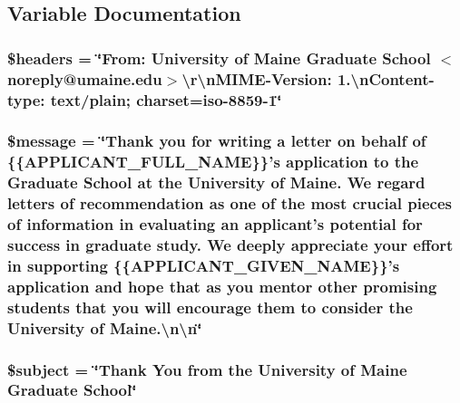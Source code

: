 \subsection{Variable Documentation}
\hypertarget{reference_thank_you_8email_8php_a52500036ee807241b8b4b7e2367c49ef}{
\subsubsection[{\$headers}]{\setlength{\rightskip}{0pt plus 5cm}\$headers = \char`\"{}From\-: University of Maine Graduate School $<$noreply@umaine.\-edu$>$\textbackslash{}r\textbackslash{}n\-M\-I\-M\-E-\/Version\-: 1.\textbackslash{}n\-Content-\/type\-: text/plain; charset=iso-\/8859-\/1\char`\"{}}}\label{reference_thank_you_8email_8php_a52500036ee807241b8b4b7e2367c49ef}
\hypertarget{reference_thank_you_8email_8php_abf17cb2dba2ed17cb28aa5f37deb5293}{
\subsubsection[{\$message}]{\setlength{\rightskip}{0pt plus 5cm}\$message = \char`\"{}Thank you for writing a letter on behalf of \{\{A\-P\-P\-L\-I\-C\-A\-N\-T\-\_\-\-F\-U\-L\-L\-\_\-\-N\-A\-M\-E\}\}'s application to the Graduate School at the University of Maine. We regard letters of recommendation as one of the most crucial pieces of information in evaluating an applicant's potential for success in graduate study. We deeply appreciate your effort in supporting \{\{A\-P\-P\-L\-I\-C\-A\-N\-T\-\_\-\-G\-I\-V\-E\-N\-\_\-\-N\-A\-M\-E\}\}'s application and hope that as you mentor other promising students that you will encourage them to consider the University of Maine.\textbackslash{}n\textbackslash{}n\char`\"{}}}\label{reference_thank_you_8email_8php_abf17cb2dba2ed17cb28aa5f37deb5293}
\hypertarget{reference_thank_you_8email_8php_afea90503726cd5ad2eb80baf0b6d217d}{
\subsubsection[{\$subject}]{\setlength{\rightskip}{0pt plus 5cm}\$subject = \char`\"{}Thank You from the University of Maine Graduate School\char`\"{}}}\label{reference_thank_you_8email_8php_afea90503726cd5ad2eb80baf0b6d217d}
